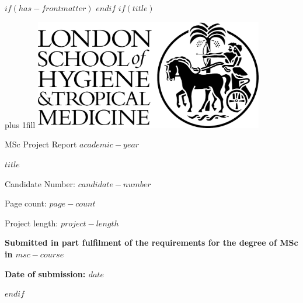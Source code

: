 $if(has-frontmatter)$
\frontmatter
$endif$
$if(title)$
\cleardoublepage
\thispagestyle{empty}
{\centering
\hbox{}\vskip 0cm plus 1fill
\includegraphics[width=10cm]{img/lshtm_logo_small.jpg}
\par
\vspace{6ex}
{\Large MSc Project Report $academic-year$ \par}
\vspace{6ex}
{\Huge\bfseries $title$ \par}
\vspace{6ex}
{\Large Candidate Number: $candidate-number$ \par}
\vspace{12ex}
{\small Page count:  $page-count$ \par}
\vspace{3ex}
{\small Project length: $project-length$ \par}
\vspace{6ex}
{\bfseries\large Submitted in part fulfilment of the requirements for the degree of MSc in $msc-course$ \par}
\vspace{3ex}
{\bfseries\large Date of submission:  $date$ \par}
\vspace{12ex}
}
$endif$
\pagestyle{plain}
